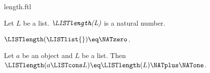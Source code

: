 \documentclass{naproche-library}
\begin{document}
\begin{smodule}[title=Length]{length.ftl}

\begin{signature}[forthel,id=LengthSig]
  Let $L$ be a list.
  $\emph{\LISTlength(L)}$ is a natural number.
\end{signature}

\begin{axiom}[forthel,id=LengthOfNilAx]
  $\LISTlength(\LISTlist{}) \eq \NATzero$.
\end{axiom}

\begin{axiom}[forthel,id=LengthOfConsAx]
  Let $a$ be an object and $L$ be a list.
  Then $\LISTlength(a \LISTcons L) \eq \LISTlength(L) \NATplus \NATone$.
\end{axiom}
\end{smodule}
\end{document}
